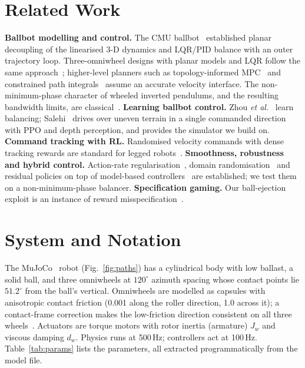 \documentclass[conference]{IEEEtran}
\theoremstyle{remark}
\begin{document}
\section{Related Work}
\textbf{Ballbot modelling and control.} The CMU ballbot~\cite{lauwers2006,nagarajan2014} established planar decoupling of the linearised 3-D dynamics and LQR/PID balance with an outer trajectory loop. Three-omniwheel designs with planar models and LQR follow the same approach~\cite{fankhauser2010,abdelrahim2025,xiao2023}; higher-level planners such as topology-informed MPC~\cite{mavrogiannis2021} and constrained path integrals~\cite{carius2022} assume an accurate velocity interface. The non-minimum-phase character of wheeled inverted pendulums, and the resulting bandwidth limits, are classical~\cite{astrom2008}. \textbf{Learning ballbot control.} Zhou \emph{et al.}~\cite{zhou2022} learn balancing; Salehi~\cite{salehi2025} drives over uneven terrain in a single commanded direction with PPO and depth perception, and provides the simulator we build on. \textbf{Command tracking with RL.} Randomised velocity commands with dense tracking rewards are standard for legged robots~\cite{hwangbo2019,lee2020,rudin2022}. \textbf{Smoothness, robustness and hybrid control.} Action-rate regularisation~\cite{mysore2021}, domain randomisation~\cite{tobin2017,peng2018} and residual policies on top of model-based controllers~\cite{johannink2019,silver2018} are established; we test them on a non-minimum-phase balancer. \textbf{Specification gaming.} Our ball-ejection exploit is an instance of reward misspecification~\cite{amodei2016}.

\section{System and Notation}\label{sec:system}
The MuJoCo~\cite{todorov2012} robot (Fig.~\ref{fig:paths}) has a cylindrical body with low ballast, a solid ball, and three omniwheels at $120^\circ$ azimuth spacing whose contact points lie $51.2^\circ$ from the ball's vertical. Omniwheels are modelled as capsules with anisotropic contact friction (0.001 along the roller direction, 1.0 across it); a contact-frame correction makes the low-friction direction consistent on all three wheels~\cite{salehi2025}. Actuators are torque motors with rotor inertia (armature) $J_w$ and viscous damping $d_w$. Physics runs at 500\,Hz; controllers act at 100\,Hz. Table~\ref{tab:params} lists the parameters, all extracted programmatically from the model file.
\end{document}
